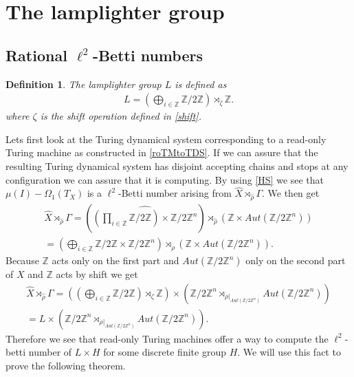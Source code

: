 \documentclass[12pt,a4paper]{scrartcl}
\newtheorem{Definition}[Theorem]{Definition}
\numberwithin{equation}{section}
\newcommand{\Z}{\mathbb{Z}} %
\newcommand{\2}{\mathbb{Z} / 2 \mathbb{Z}}
\newcommand{\1}{\bar{1}}
\newcommand{\0}{\bar{0}}
\begin{document}
\section{The lamplighter group}
\subsection{Rational $\ell^2$-Betti numbers}
\begin{Definition}
	The lamplighter group $L$ is defined as
	\begin{align*}
		L = (\bigoplus_{i \in \Z} \2) \rtimes_{\zeta} \Z.
	\end{align*}
	where $\zeta$ is the shift operation defined in \ref{shift}.
\end{Definition}
Lets first look at the Turing dynamical system corresponding to a read-only Turing machine as constructed in \ref{roTMtoTDS}. If we can assure that the resulting Turing dynamical system has disjoint accepting chains and stops at any configuration we can assure that it is computing. By using \ref{HS} we see that $\mu (I) - \Omega_1(T_X)$ is a $\ell^2$-Betti number arising from $\hat{X} \rtimes_{\hat{\rho}} \Gamma$. We then get
\begin{align*}
	\hat{X} \rtimes_{\hat{\rho}} \Gamma = (\widehat{(\prod_{i \in \Z} \2) \times \2^n}) \rtimes_{\hat{\rho}} (\Z \times Aut(\2^n)) \\
	= (\bigoplus_{i \in \Z} \2 \times \2^n) \rtimes_{\rho} (\Z \times Aut(\2^n)).
\end{align*}
Because $\Z$ acts only on the first part and $Aut(\2^n)$ only on the second part of $X$ and $\Z$ acts by shift we get
\begin{align*}
	\hat{X} \rtimes_{\hat{\rho}} \Gamma = ((\bigoplus_{i \in \Z} \2) \rtimes_{\zeta} \Z) \times (\2^n \rtimes_{\rho|_{Aut(\2^n)}} Aut(\2^n)) \\
	= L \times (\2^n \rtimes_{\rho|_{Aut(\2^n)}} Aut(\2^n)).
\end{align*}
Therefore we see that read-only Turing machines offer a way to compute the $\ell^2$-betti number of $L \times H$ for some discrete finite group $H$. We will use this fact to prove the following theorem.
\end{document}
